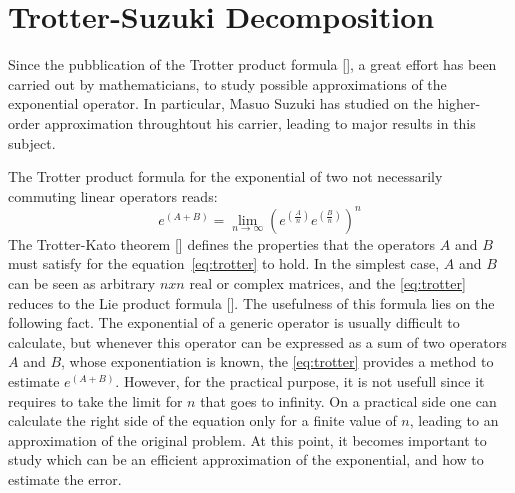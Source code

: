 \chapter{Trotter-Suzuki Decomposition}

Since the pubblication of the Trotter product formula [], a great effort has been carried out by mathematicians, to study possible approximations of the exponential operator. In particular, Masuo Suzuki has studied on the higher-order approximation throughtout his carrier, leading to major results in this subject.

The Trotter product formula for the exponential of two not necessarily commuting linear operators reads:
\begin{equation} \label{eq:trotter}
e^{(A+B)} = \lim_{n\rightarrow\infty} (e^{(\frac{A}{n})} e^{(\frac{B}{n})})^n
\end{equation}
The Trotter-Kato theorem [] defines the properties that the operators $A$ and $B$ must satisfy for the equation~\eqref{eq:trotter} to hold. In the simplest case, $A$ and $B$ can be seen as arbitrary $nxn$ real or complex matrices, and the \eqref{eq:trotter} reduces to the Lie product formula []. The usefulness of this formula lies on the following fact. The exponential of a generic operator is usually difficult to calculate, but whenever this operator can be expressed as a sum of two operators $A$ and $B$, whose exponentiation is known, the \eqref{eq:trotter} provides a method to estimate $e^{(A+B)}$. However, for the practical purpose, it is not usefull since it requires to take the limit for $n$ that goes to infinity. On a practical side one can calculate the right side of the equation only for a finite value of $n$, leading to an approximation of the original problem. At this point, it becomes important to study which can be an efficient approximation of the exponential, and how to estimate the error.

